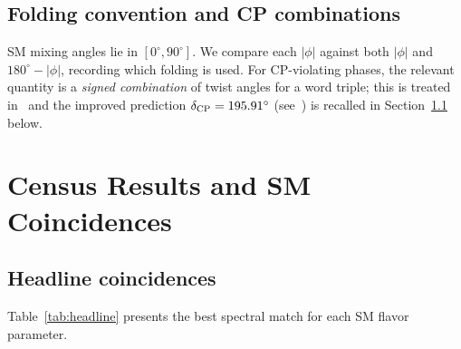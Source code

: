 \documentclass[11pt,a4paper]{article}
\newcommand{\degr}{^{\circ}}
\begin{document}
\subsection{Folding convention and CP combinations}

SM mixing angles lie in $[0\degr,90\degr]$.
We compare each $|\phi|$ against both $|\phi|$ and $180\degr-|\phi|$,
recording which folding is used.
For CP-violating phases, the relevant quantity is a \emph{signed combination}
of twist angles for a word triple; this is treated in~\cite{GentryCP} and
the improved prediction $\delta_{\rm CP}=195.91\degr$ (see~\cite{GentryCP}) is recalled in
Section~\ref{sec:headline} below.

\section{Census Results and SM Coincidences}
\label{sec:results}

\subsection{Headline coincidences}
\label{sec:headline}

Table~\ref{tab:headline} presents the best spectral match for each SM flavor
parameter.
\end{document}
